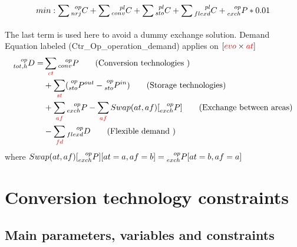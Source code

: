 \documentclass[a4paper,11pt]{article}
\begin{document}
$$min : \sum_{} \prescript{op}{nrj}{C}  + \sum \prescript{pl}{conv}{C} + \sum \prescript{pl}{sto}{C} + \sum \prescript{pl}{flexd}{C} + \prescript{op}{exch}{P}*0.01  $$
The last term is used here to avoid a dummy exchange solution. 
Demand Equation labeled (Ctr\_Op\_operation\_demand) applies on   $[\textcolor{red}{evo}  \times \textcolor{red}{at}]$
\begin{align} 
    \prescript{op}{tot,h}{D} = & \sum_{\textcolor{red}{ct}}  \prescript{op}{conv}{P} \tag{Conversion technologies } \\ 
    &+\sum_{\textcolor{red}{st}} (\prescript{op}{sto}{P^{out}} -\prescript{op}{sto}{P^{in}}) \tag{Storage technologies}\\
    &+ \sum_{\textcolor{red}{af}}  \prescript{op}{exch}{P} - \sum_{\textcolor{red}{af}} Swap(at,af)[ \prescript{op}{exch}{P}]
    \tag{Exchange between areas}\\   
    & - \sum_{\textcolor{red}{fd}}  \prescript{op}{flexd}{D} \tag{Flexible demand  } \\   
\end{align}
where $Swap(at,af)[ \prescript{op}{exch}{P}][at = a,af = b] = \prescript{op}{exch}{P}[at = b,af = a] $



\newpage

\section{Conversion technology constraints}

\subsection{Main parameters, variables and constraints}
\end{document}
